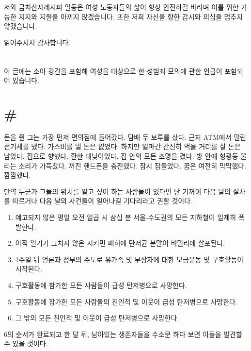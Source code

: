 \documentclass[a5paper,10pt, twoside, openright]{memoir}
\begin{document}
저와 금치산자레시피 일동은 여성 노동자들의 삶이 항상 안전하길 바라며 이를 위한 가능한 지지와 지원을 아끼지 않겠습니다. 또한 저희 자신을 향한 감시와 의심을 멈추지 않겠습니다.

읽어주셔서 감사합니다.

\clearpage

\section{ }
이 글에는 소아 강간을 포함해 여성을 대상으로 한 성범죄 모의에 관한 언급이 포함되어 있습니다.

\section{\#} 
	돈을 쥔 그는 가장 먼저 편의점에 들어갔다. 담배 두 보루를 샀다. 근처 ATM에서 밀린 전기세를 냈다. 가스비를 낼 돈은 없었다. 하지만 얼마간 간신히 먹을 거리를 살 돈은 남았다. 집으로 향했다. 환한 대낮이었다. 집 안의 모든 조명을 켰다. 방 안에 형광등 울리는 소리가 가득찼다. 꺼진 핸드폰을 충전했다. 잠시 잠들었다. 꿈은 여전히 막막했다. 깜깜했다.

	만약 누군가 그들의 위치를 알고 싶어 하는 사람들이 있다면 난 기꺼이 다음 날의 절차를 따르거나 다음 날의 사건들이 일어나길 기다리라고 권할 것이다.
	
				\begin{adjustwidth}{1em}{3em}	
	\begin{enumerate}
	\item 예고되지 않은 평일 오전 일곱 시 삼십 분 서울-수도권의 모든 지하철이 일제히 폭발한다. 
	\item 아직 열기가 그치지 않은 시커먼 페허에 탄저균 분말이 비밀리에 살포된다. 
	\item 1주일 뒤 언론과 정부의 주도로 유가족 및 부상자에 대한 모금운동 및 구호활동이 시작된다. 
	\item 구호활동에 참가한 모든 사람들이 급성 탄저병으로 사망한다. 
	\item 구호활동에 참가한 모든 사람들의 친인척 및 이웃이 급성 탄저병으로 사망한다. 
	\item 그 밖의 모든 친인척 및 이웃이 급성 탄저병으로 사망한다. 
	\end{enumerate}
				\end{adjustwidth}

	6의 순서가 완료되고 한 달 뒤, 남아있는 생존자들을 수소문 하다 보면 이들을 발견할 수 있을 것이다.
\end{document}
